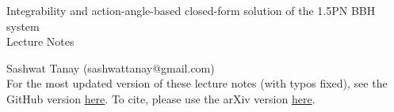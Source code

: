 \documentclass[12pt]{report}
\begin{document}
\begin{titlepage}


\begin{center}
{\Large Integrability and action-angle-based closed-form solution of the 1.5PN BBH system}\\
Lecture Notes\\
\end{center}
\begin{center}
Sashwat Tanay (sashwattanay@gmail.com)\\


For the most updated version of these lecture notes (with typos fixed), 
see the GitHub version \href{https://github.com/sashwattanay/lectures_integrability_action-angles_PN_BBH/blob/gh-action-result/pdflatex/lecture_notes/main.pdf}{here}.
To cite, please use the arXiv version \href{arXiv version}{here}.
\end{center}
\end{titlepage}



\tableofcontents















\end{document}
